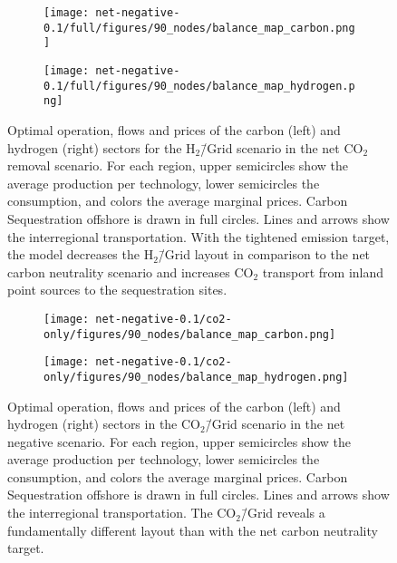 \documentclass[twocolumn]{article}
\newcommand{\carbon}{CO$_2$}
\newcommand{\carbongrid}{CO$_2$\=/Grid}
\newcommand{\hydrogengrid}{H$_2$\=/Grid}
\newcommand{\carbonscenario}{CO$_2$\=/Grid scenario}
\newcommand{\hydrogenscenario}{H$_2$\=/Grid scenario}
\begin{document}
\begin{figure}[ht!]
    \centering
    \begin{subfigure}{.5\textwidth}
        \centering
        \texttt{[image: net-negative-0.1/full/figures/90\_nodes/balance\_map\_carbon.png]}
        \label{fig:balance_map_carbon_full_nn}
    \end{subfigure}%
    \begin{subfigure}{.5\textwidth}
        \centering
        \texttt{[image: net-negative-0.1/full/figures/90\_nodes/balance\_map\_hydrogen.png]}
        \label{fig:balance_map_hydrogen_full_nn}
    \end{subfigure}
    \caption{Optimal operation, flows and prices of the carbon (left) and hydrogen (right) sectors for the \hydrogenscenario{} in the net \carbon{} removal scenario. For each region, upper semicircles show the average production per technology, lower semicircles the consumption, and colors the average marginal prices. Carbon Sequestration offshore is drawn in full circles. Lines and arrows show the interregional transportation. With the tightened emission target, the model decreases the \hydrogengrid{} layout in comparison to the net carbon neutrality scenario and increases \carbon{} transport from inland point sources to the sequestration sites.
    }
    \label{fig:balance_maps_full_nn}
\end{figure}

\begin{figure}[ht!]
    \centering
    \begin{subfigure}{.5\textwidth}
        \centering
        \texttt{[image: net-negative-0.1/co2-only/figures/90\_nodes/balance\_map\_carbon.png]}
        \label{fig:balance_map_carbon_co2_nn}
    \end{subfigure}%
    \begin{subfigure}{.5\textwidth}
        \centering
        \texttt{[image: net-negative-0.1/co2-only/figures/90\_nodes/balance\_map\_hydrogen.png]}
        \label{fig:balance_map_hydrogen_co2_nn}
    \end{subfigure}
    \caption{Optimal operation, flows and prices of the carbon (left) and hydrogen (right) sectors in the \carbonscenario{} in the net negative scenario. For each region, upper semicircles show the average production per technology, lower semicircles the consumption, and colors the average marginal prices. Carbon Sequestration offshore is drawn in full circles. Lines and arrows show the interregional transportation. The \carbongrid{} reveals a fundamentally different layout than with the net carbon neutrality target.
    }
    \label{fig:balance_maps_co2_nn}
\end{figure}
\end{document}
